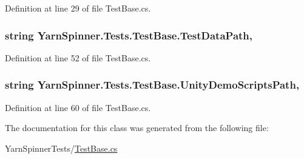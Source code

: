 Definition at line 29 of file Test\-Base.\-cs.

\hypertarget{a00164_aa9b4d902d61adad7165154a265f69aa4}{
\subsubsection[{Test\-Data\-Path}]{\setlength{\rightskip}{0pt plus 5cm}string Yarn\-Spinner.\-Tests.\-Test\-Base.\-Test\-Data\-Path\hspace{0.3cm}{\ttfamily [static]}, {\ttfamily [get]}}}\label{a00164_aa9b4d902d61adad7165154a265f69aa4}


Definition at line 52 of file Test\-Base.\-cs.

\hypertarget{a00164_a39922286f6255e4fd0e433a4fc7521c4}{
\subsubsection[{Unity\-Demo\-Scripts\-Path}]{\setlength{\rightskip}{0pt plus 5cm}string Yarn\-Spinner.\-Tests.\-Test\-Base.\-Unity\-Demo\-Scripts\-Path\hspace{0.3cm}{\ttfamily [static]}, {\ttfamily [get]}}}\label{a00164_a39922286f6255e4fd0e433a4fc7521c4}


Definition at line 60 of file Test\-Base.\-cs.



The documentation for this class was generated from the following file\-:\begin{DoxyCompactItemize}
\item 
Yarn\-Spinner\-Tests/\hyperlink{a00319}{Test\-Base.\-cs}\end{DoxyCompactItemize}
